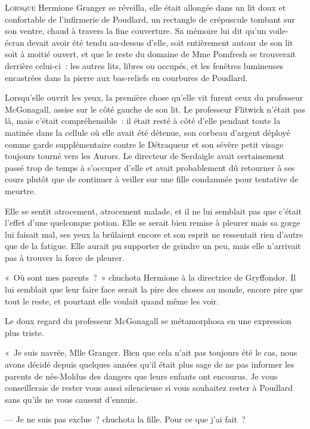 
\lettrine{L}{orsque} Hermione Granger se réveilla, elle était allongée dans un lit doux et confortable de l'infirmerie de Poudlard, un rectangle de crépuscule tombant sur son ventre, chaud à travers la fine couverture.
Sa mémoire lui dit qu'un voile-écran devait avoir été tendu au-dessus d'elle, soit entièrement autour de son lit soit à moitié ouvert, et que le reste du domaine de Mme Pomfresh se trouverait derrière celui-ci~: les autres lits, libres ou occupés, et les fenêtres lumineuses encastrées dans la pierre aux bas-reliefs en courbures de Poudlard.

Lorsqu'elle ouvrit les yeux, la première chose qu'elle vit furent ceux du professeur McGonagall, assise sur le côté gauche de son lit.
Le professeur Flitwick n'était pas là, mais c'était compréhensible~: il était resté à côté d'elle pendant toute la matinée dans la cellule où elle avait été détenue, son corbeau d'argent déployé comme garde supplémentaire contre le Détraqueur et son sévère petit visage toujours tourné vers les Aurors.
Le directeur de Serdaigle avait certainement passé trop de temps à s'occuper d'elle et avait probablement dû retourner à ses cours plutôt que de continuer à veiller sur une fille condamnée pour tentative de meurtre.

Elle se sentit atrocement, atrocement malade, et il ne lui semblait pas que c'était l'effet d'une quelconque potion.
Elle se serait bien remise à pleurer mais sa gorge lui faisait mal, ses yeux la brûlaient encore et son esprit ne ressentait rien d'autre que de la fatigue.
Elle aurait pu supporter de geindre un peu, mais elle n'arrivait pas à trouver la force de pleurer.

«~Où sont mes parents~?~»
chuchota Hermione à la directrice de Gryffondor.
Il lui semblait que leur faire face serait la pire des choses au monde, encore pire que tout le reste, et pourtant elle voulait quand même les voir.

Le doux regard du professeur McGonagall se métamorphosa en une expression plus triste.

«~Je suis navrée, Mlle Granger.
Bien que cela n'ait pas toujours été le cas, nous avons décidé depuis quelques années qu'il était plus sage de ne pas informer les parents de nés-Moldus des dangers que leurs enfants ont encourus.
Je vous conseillerais de rester vous aussi silencieuse si vous souhaitez rester à Poudlard sans qu'ils ne vous causent d'ennuis.

--- Je ne suis pas exclue~? chuchota la fille.
Pour ce que j'ai fait~?

